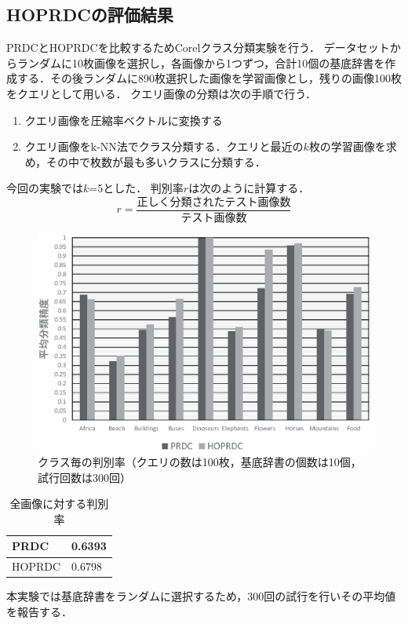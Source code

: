 \subsection{HOPRDCの評価結果}
PRDCとHOPRDCを比較するためCorelクラス分類実験を行う．
データセットからランダムに10枚画像を選択し，各画像から1つずつ，合計10個の基底辞書を作成する．その後ランダムに890枚選択した画像を学習画像とし，残りの画像100枚をクエリとして用いる．
クエリ画像の分類は次の手順で行う．
\begin{enumerate}
	\item クエリ画像を圧縮率ベクトルに変換する
	\item クエリ画像をk-NN法でクラス分類する．クエリと最近の$k$枚の学習画像を求め，その中で枚数が最も多いクラスに分類する．
\end{enumerate}
今回の実験では$k$=5とした．
判別率$r$は次のように計算する．
\begin{equation}
r=\frac{正しく分類されたテスト画像数}{テスト画像数}
\end{equation}


\begin{figure}[tb]
\begin{center}
\includegraphics[clip, width=\columnwidth]{image/PRDCvsProposed.eps}
\caption{クラス毎の判別率（クエリの数は100枚，基底辞書の個数は10個，試行回数は300回）}
\label{fig:PRDCvsProposed.eps}
\end{center}
\end{figure}
\begin{table}
\caption{全画像に対する判別率}
\label{tab:Average_PRDCvsProposed}
\begin{center}
\begin{tabular}{|l||l|}
\hline
PRDC   & 0.6393 \\
\hline
HOPRDC & 0.6798 \\
\hline
\end{tabular}
\end{center}
\end{table}
本実験では基底辞書をランダムに選択するため，300回の試行を行いその平均値を報告する．

